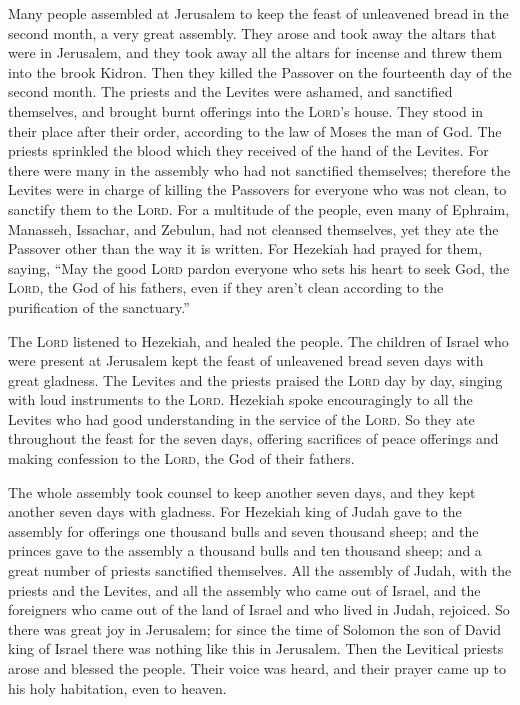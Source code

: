  Many people assembled at Jerusalem to keep the feast of
unleavened bread in the second month, a very great assembly.
 They arose and took away the altars that were in
Jerusalem, and they took away all the altars for incense and threw them
into the brook Kidron.  Then they killed the Passover on
the fourteenth day of the second month. The priests and the Levites were
ashamed, and sanctified themselves, and brought burnt offerings into the
\textsc{Lord}'s house.  They stood in their place after
their order, according to the law of Moses the man of God. The priests
sprinkled the blood which they received of the hand of the Levites.
 For there were many in the assembly who had not
sanctified themselves; therefore the Levites were in charge of killing
the Passovers for everyone who was not clean, to sanctify them to the
\textsc{Lord}.  For a multitude of the people, even many
of Ephraim, Manasseh, Issachar, and Zebulun, had not cleansed
themselves, yet they ate the Passover other than the way it is written.
For Hezekiah had prayed for them, saying, ``May the good \textsc{Lord}
pardon everyone  who sets his heart to seek God, the
\textsc{Lord}, the God of his fathers, even if they aren't clean
according to the purification of the sanctuary.''

 The \textsc{Lord} listened to Hezekiah, and healed the
people.  The children of Israel who were present at
Jerusalem kept the feast of unleavened bread seven days with great
gladness. The Levites and the priests praised the \textsc{Lord} day by
day, singing with loud instruments to the \textsc{Lord}. 
Hezekiah spoke encouragingly to all the Levites who had good
understanding in the service of the \textsc{Lord}. So they ate
throughout the feast for the seven days, offering sacrifices of peace
offerings and making confession to the \textsc{Lord}, the God of their
fathers.

 The whole assembly took counsel to keep another seven
days, and they kept another seven days with gladness. 
For Hezekiah king of Judah gave to the assembly for offerings one
thousand bulls and seven thousand sheep; and the princes gave to the
assembly a thousand bulls and ten thousand sheep; and a great number of
priests sanctified themselves.  All the assembly of
Judah, with the priests and the Levites, and all the assembly who came
out of Israel, and the foreigners who came out of the land of Israel and
who lived in Judah, rejoiced.  So there was great joy in
Jerusalem; for since the time of Solomon the son of David king of Israel
there was nothing like this in Jerusalem.  Then the
Levitical priests arose and blessed the people. Their voice was heard,
and their prayer came up to his holy habitation, even to heaven.

